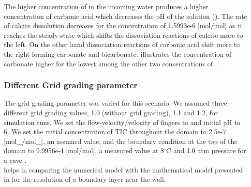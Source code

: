 The higher concentration of  in the incoming water produces a higher concentration of carbonic acid which decreases the pH of 
the solution (). The rate of calcite dissolution decreases for the  concentration
of 1.5993e-6 [mol/mol] as it reaches the steady-state which shifts the dissociation reactions of calcite more to the left. 
On the other hand dissociation reactions of carbonic acid shift more to the right forming carbonate and bicarbonate. 
 illustrates the concentration of carbonate higher for the lowest among the other two concentrations of .


\subsubsection*{Different Grid grading parameter} \label{ssec:diffGrid}

The grid grading parameter was varied for this scenario. We assumed three different grid grading values, 
1.0 (without grid grading), 1.1 and 1.2, for simulation runs. We set the flow-velocity/velocity of  fingers to  
and initial pH to 6. We set the initial concentration of TIC throughout the domain to 2.5e-7 [mol\_/mol\_], 
an assumed value, and the boundary condition at the top of the domain to 9.9956e-4 [mol/mol], a measured value at 8$^{\circ}$C 
and 1.0 atm pressure for a cave \cite{Class2020}. \\

 helps in comparing the numerical model with the mathematical model presented in 
for the resolution of a boundary layer near the wall. \\

